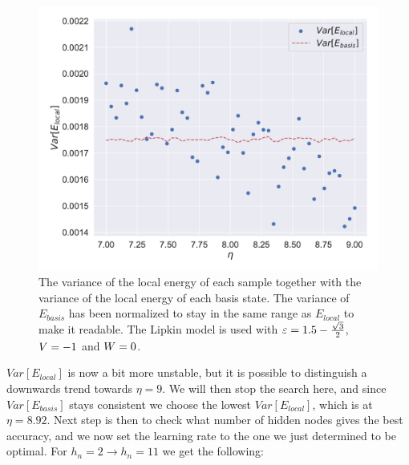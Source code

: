 \begin{figure}[H]
  \begin{center}
    \includegraphics[width=\optgridwidhtratio\textwidth]{Figures/Plots/OPt/Lipkin/[2][learning_rate][e=500][7.0-9.0]}
  \end{center}
  \caption{The variance of the local energy of each sample together with the variance of the local energy of each basis state. The variance of $E_{basis}$ has been normalized to stay in the same range as $E_{local}$ to make it readable. The Lipkin model is used with $\varepsilon = 1.5 - \frac{\sqrt{3}}{2}$, $V = -1$ and $W = 0$.}\label{fig:lipkin_opt_ng_depth2}
\end{figure}

$Var[E_{local}]$ is now a bit more unstable, but it is possible to distinguish a downwards trend towards $\eta = 9$. We will then stop the search here, and since $Var[E_{basis}]$ stays consistent we choose the lowest $Var[E_{local}]$, which is at $\eta = 8.92$. Next step is then to check what number of hidden nodes gives the best accuracy, and we now set the learning rate to the one we just determined to be optimal. For $h_n = 2 \rightarrow h_n = 11$ we get the following:

